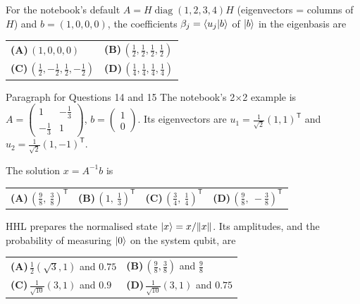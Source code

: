 \documentclass[11pt,a4paper]{article}
\newcommand{\optlabel}[1]{\textbf{(#1)}}
\newenvironment{qitem}[1]{\begin{list}{}{\setlength{\leftmargin}{3.3em}\setlength{\labelwidth}{3.1em}%
  \setlength{\labelsep}{0.2em}\setlength{\topsep}{3pt}\setlength{\parsep}{3pt}}\item[\textbf{Q.#1}\hfill]}{\end{list}}
\newcommand{\qsep}{\par\vspace{2pt}{\color{black!15}\hrule}\vspace{4pt}}
\begin{document}
\begin{qitem}{13}
For the notebook's default $A = H\operatorname{diag}(1, 2, 3, 4)H$ (eigenvectors = columns of $H$) and $b = (1, 0, 0, 0)$, the coefficients $\beta_j = \braket{u_j|b}$ of
$\ket b$ in the eigenbasis are
\par\smallskip\noindent\begin{tabularx}{\linewidth}{@{}*{2}{L}@{}}
\optlabel{A}\,$(1, 0, 0, 0)$ & \optlabel{B}\,$(\tfrac12, \tfrac12, \tfrac12, \tfrac12)$ \\[3pt]
\optlabel{C}\,$(\tfrac12, -\tfrac12, \tfrac12, -\tfrac12)$ & \optlabel{D}\,$(\tfrac14, \tfrac14, \tfrac14, \tfrac14)$
\end{tabularx}
\end{qitem}
\qsep

\begin{passagebox}{Paragraph for Questions 14 and 15}
The notebook's 2$\times$2 example is $A = \begin{pmatrix}1 & -\tfrac13\\ -\tfrac13 & 1\end{pmatrix}$, $b = \begin{pmatrix}1\\0\end{pmatrix}$. Its eigenvectors are
$u_1 = \tfrac{1}{\sqrt2}(1, 1)^{\mathsf T}$ and $u_2 = \tfrac{1}{\sqrt2}(1, -1)^{\mathsf T}$.
\end{passagebox}
\begin{qitem}{14}
The solution $x = A^{-1}b$ is
\par\smallskip\noindent\begin{tabularx}{\linewidth}{@{}*{4}{L}@{}}
\optlabel{A}\,$(\tfrac98,\ \tfrac38)^{\mathsf T}$ & \optlabel{B}\,$(1,\ \tfrac13)^{\mathsf T}$ & \optlabel{C}\,$(\tfrac34,\ \tfrac14)^{\mathsf T}$ & \optlabel{D}\,$(\tfrac98,\ -\tfrac38)^{\mathsf T}$
\end{tabularx}
\end{qitem}
\qsep

\begin{qitem}{15}
HHL prepares the normalised state $\ket x = x/\|x\|$. Its amplitudes, and the probability of measuring $\ket0$ on the system qubit, are
\par\smallskip\noindent\begin{tabularx}{\linewidth}{@{}*{2}{L}@{}}
\optlabel{A}\,$\tfrac12(\sqrt3, 1)$ and $0.75$ & \optlabel{B}\,$(\tfrac98, \tfrac38)$ and $\tfrac98$ \\[3pt]
\optlabel{C}\,$\tfrac{1}{\sqrt{10}}(3, 1)$ and $0.9$ & \optlabel{D}\,$\tfrac{1}{\sqrt{10}}(3, 1)$ and $0.75$
\end{tabularx}
\end{qitem}
\qsep
\end{document}
